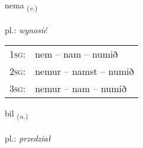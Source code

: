 \documentclass[frontgrid, backgrid]{flacards}\usepackage[]{graphicx}\usepackage[]{xcolor}
\begin{document}
\renewcommand{\flhead}{\vskip5pt \fboxsep=0pt {\small\bfseries\footnotesize Sagnorð | Verb}}
\renewcommand{\fcfoot}{\vskip5pt \fboxsep=0pt \hspace{2pt}{\small\bfseries\footnotesize 1K}}

\renewcommand{\blhead}{\vskip5pt {\small\bfseries\footnotesize Sagnorð | Verb }}
\renewcommand{\bcfoot}{\vskip5pt \hspace{2pt}{\small\bfseries\footnotesize 1K}}


{nema \small{\textsubscript{(\textit{v.})}} \\[1ex] %
\textphonetic{[nɛːma]} \\
pl.: \emph{wynosić} \\  [2ex]
\renewcommand*{\arraystretch}{0.8}
\begin{tabular}{p{1cm}l}
\textsc{1sg}: & nem -- nam -- numið \\ 
\textsc{2sg}: & nemur -- namst -- numið \\ 
\textsc{3sg}: & nemur -- nam -- numið \\ 
\end{tabular}
}

\renewcommand{\flhead}{\vskip5pt \fboxsep=0pt {\small\bfseries\footnotesize Nafnorð | Noun}}
\renewcommand{\fcfoot}{\vskip5pt \fboxsep=0pt \hspace{2pt}{\small\bfseries\footnotesize 1K}}

\renewcommand{\blhead}{\vskip5pt {\small\bfseries\footnotesize Nafnorð | Noun }}
\renewcommand{\bcfoot}{\vskip5pt \hspace{2pt}{\small\bfseries\footnotesize 1K}}


{bil \small{\textsubscript{(\textit{n.})}} \\[1ex] %
\textphonetic{[pɪːl]} \\
pl.: \emph{przedział} \\  [2ex]
\renewcommand*{\arraystretch}{0.8}
}
\end{document}
